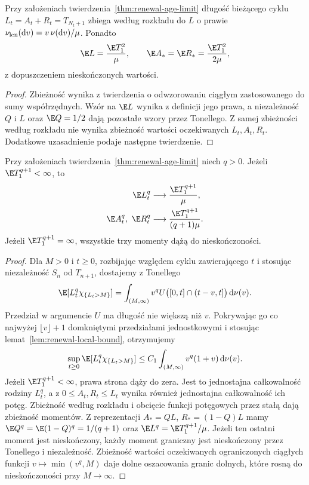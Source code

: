 \begin{wniosek}
Przy założeniach twierdzenia~\ref{thm:renewal-age-limit}
długość bieżącego cyklu $L_t=A_t+R_t=T_{N_t+1}$
zbiega według rozkładu do $L$ o prawie
$\nu_{\rm len}(\mathrm dv)=v\,\nu(\mathrm dv)/\mu$.
Ponadto
\[
\E L=\frac{\E T_1^2}{\mu},\qquad
\E A_*=\E R_*=\frac{\E T_1^2}{2\mu},
\]
z dopuszczeniem nieskończonych wartości.
\end{wniosek}
\begin{proof}
Zbieżność wynika z twierdzenia o odwzorowaniu
ciągłym zastosowanego do sumy współrzędnych.
Wzór na $\E L$ wynika z definicji jego prawa,
a niezależność $Q$ i $L$ oraz $\E Q=1/2$
dają pozostałe wzory przez Tonellego.
Z samej zbieżności według rozkładu nie wynika
zbieżność wartości oczekiwanych $L_t,A_t,R_t$.
Dodatkowe uzasadnienie podaje następne twierdzenie.
\end{proof}

\begin{twierdzenie}
\label{thm:renewal-age-moments}
Przy założeniach twierdzenia~\ref{thm:renewal-age-limit}
niech $q>0$. Jeżeli $\E T_1^{q+1}<\infty$, to
\[
\begin{aligned}
\E L_t^q&\longrightarrow \frac{\E T_1^{q+1}}{\mu},\\
\E A_t^q,\ \E R_t^q&\longrightarrow
\frac{\E T_1^{q+1}}{(q+1)\mu}.
\end{aligned}
\]
Jeżeli $\E T_1^{q+1}=\infty$, wszystkie trzy
momenty dążą do nieskończoności.
\end{twierdzenie}
\begin{proof}
Dla $M>0$ i $t\ge0$, rozbijając względem cyklu
zawierającego $t$ i stosując niezależność $S_n$
od $T_{n+1}$, dostajemy z Tonellego
\[
\E[L_t^q\chi_{\{L_t>M\}}]
=\int_{(M,\infty)} v^q
U\bigl([0,t]\cap(t-v,t]\bigr)\,\mathrm d\nu(v).
\]
Przedział w argumencie $U$ ma długość nie większą
niż $v$. Pokrywając go co najwyżej $\lfloor v\rfloor+1$
domkniętymi przedziałami jednostkowymi i stosując
lemat~\ref{lem:renewal-local-bound}, otrzymujemy
\[
\sup_{t\ge0}\E[L_t^q\chi_{\{L_t>M\}}]
\le C_1\int_{(M,\infty)} v^q(1+v)\,\mathrm d\nu(v).
\]
Jeżeli $\E T_1^{q+1}<\infty$, prawa strona dąży
do zera. Jest to jednostajna całkowalność
rodziny $L_t^q$, a z $0\le A_t,R_t\le L_t$
wynika również jednostajna całkowalność ich potęg.
Zbieżność według rozkładu i obcięcie funkcji
potęgowych przez stałą dają zbieżność momentów.
Z reprezentacji $A_*=QL$, $R_*=(1-Q)L$ mamy
$\E Q^q=\E(1-Q)^q=1/(q+1)$ oraz
$\E L^q=\E T_1^{q+1}/\mu$.
Jeżeli ten ostatni moment jest nieskończony,
każdy moment graniczny jest nieskończony
przez Tonellego i niezależność. Zbieżność
wartości oczekiwanych ograniczonych ciągłych
funkcji $v\mapsto\min(v^q,M)$ daje dolne
oszacowania granic dolnych, które rosną
do nieskończoności przy $M\to\infty$.
\end{proof}

